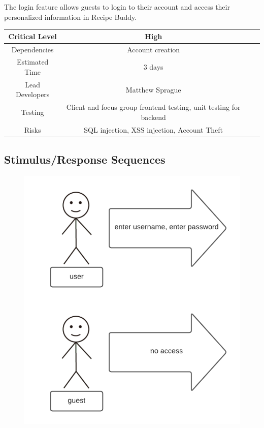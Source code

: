 \documentclass{scrreprt}
\begin{document}
The login feature allows guests to login to their account and access their personalized information in \gls{Recipe Buddy}.

\begin{center}
    \begin{tabular}{| c | c | c | c |}
        \hline
        Critical Level  & High                                                              \\
        \hline
        Dependencies    & Account creation                                                  \\
        \hline
        Estimated Time  & 3 days                                                            \\
        \hline
        Lead Developers & Matthew Sprague                             \\
        \hline
        Testing         & Client and focus group \gls{frontend} testing,
                          \gls{unit testing} for \gls{backend}                              \\
        \hline
        Risks           & \gls{SQL injection}, \gls{XSS injection}, Account Theft           \\
        \hline
    \end{tabular}
\end{center}

\subsection{Stimulus/Response Sequences}

\begin{figure}[H]\centering
    \includegraphics[width=\columnwidth]{response diagrams/Login.png}
\end{figure}
\end{document}
